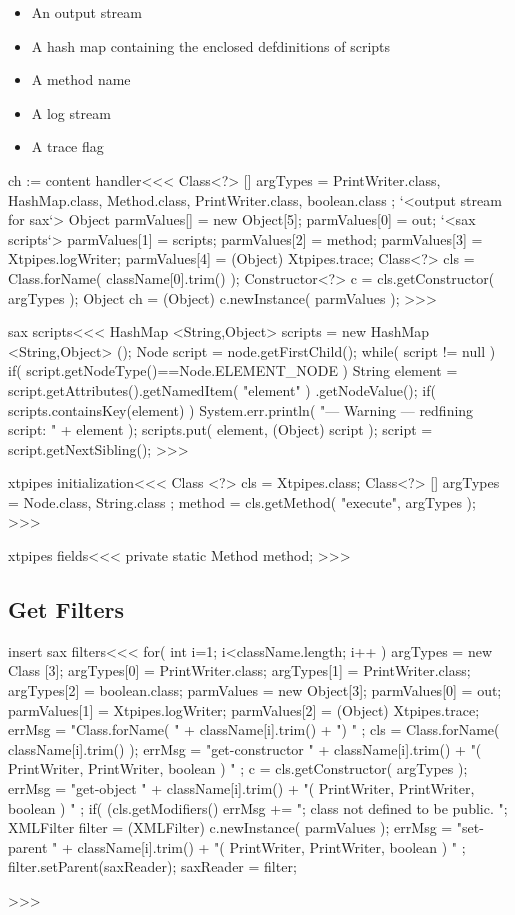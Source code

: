 \documentclass{article}
\begin{document}
{\begin{itemize}
\item
An output stream
\item
A hash map containing the enclosed defdinitions of scripts
\item A method name
\item A log stream
\item A trace flag
\end{itemize}


\<ch := content handler\><<<
Class<?> [] argTypes = {
         PrintWriter.class, HashMap.class, Method.class,
         PrintWriter.class, boolean.class };
`<output stream for sax`>
Object parmValues[] = new Object[5];
parmValues[0] = out;
`<sax scripts`>  parmValues[1] = scripts;
parmValues[2] = method;
parmValues[3] = Xtpipes.logWriter;
parmValues[4] = (Object) Xtpipes.trace;
Class<?> cls = Class.forName( className[0].trim() );
Constructor<?> c = cls.getConstructor( argTypes );
Object ch = (Object) c.newInstance( parmValues );
>>>

\<sax scripts\><<<
HashMap <String,Object> scripts = new HashMap <String,Object> ();
Node script = node.getFirstChild();
while( script != null ){
  if( script.getNodeType()==Node.ELEMENT_NODE ){
     String element = script.getAttributes().getNamedItem( "element" )
                                       .getNodeValue();
     if( scripts.containsKey(element) ){
        System.err.println(
           "--- Warning --- redfining script: " + element );
     }
     scripts.put( element, (Object) script );
  }
  script = script.getNextSibling();
}
>>>

\<xtpipes initialization\><<<
Class <?> cls = Xtpipes.class;
Class<?> [] argTypes = { Node.class, String.class };
method = cls.getMethod( "execute", argTypes );
>>>

\<xtpipes fields\><<<
private static Method method;
>>>

\subsection{Get Filters}



\<insert sax filters\><<<
for( int i=1; i<className.length; i++ ){
   argTypes = new Class [3];
   argTypes[0] = PrintWriter.class;
   argTypes[1] = PrintWriter.class;
   argTypes[2] = boolean.class;
   parmValues = new Object[3];
   parmValues[0] = out;
   parmValues[1] = Xtpipes.logWriter;
   parmValues[2] = (Object) Xtpipes.trace;
   errMsg = "Class.forName( " + className[i].trim() + ") " ;
   cls = Class.forName( className[i].trim() );
   errMsg = "get-constructor "
            + className[i].trim()
            + "( PrintWriter, PrintWriter, boolean ) " ;
   c = cls.getConstructor( argTypes );
   errMsg = "get-object "
            + className[i].trim()
            + "( PrintWriter, PrintWriter, boolean ) " ;
   if( (cls.getModifiers() %
      errMsg += "; class not defined to be public. ";
   }
   XMLFilter filter = (XMLFilter) c.newInstance( parmValues );
   errMsg = "set-parent "
            +  className[i].trim()
            + "( PrintWriter, PrintWriter, boolean ) " ;
   filter.setParent(saxReader);
   saxReader = filter;
}
>>>
\end{document}

